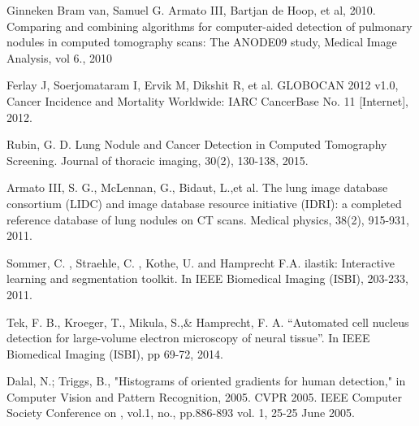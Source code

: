 \documentclass[conference]{IEEEtran}
\begin{document}
\begin{thebibliography}{1}

Ginneken Bram van, Samuel G. Armato III, Bartjan de Hoop, et al, 2010.  Comparing and combining algorithms for computer-aided detection of pulmonary nodules in computed tomography scans: The ANODE09 study, Medical Image Analysis, vol 6., 2010

Ferlay J, Soerjomataram I, Ervik M, Dikshit R, et al. GLOBOCAN 2012 v1.0, Cancer Incidence and Mortality Worldwide: IARC CancerBase No. 11 [Internet], 2012.

Rubin, G. D. Lung Nodule and Cancer Detection in Computed Tomography Screening. Journal of thoracic imaging, 30(2), 130-138, 2015.

Armato III, S. G., McLennan, G., Bidaut, L.,et al. The lung image database consortium (LIDC) and image database resource initiative (IDRI): a completed reference database of lung nodules on CT scans. Medical physics, 38(2), 915-931, 2011.

Sommer, C. , Straehle, C. , Kothe, U. and Hamprecht F.A. ilastik: Interactive learning and segmentation toolkit. In IEEE Biomedical Imaging (ISBI), 203-233, 2011.

Tek, F. B., Kroeger, T., Mikula, S.,\& Hamprecht, F. A. “Automated cell nucleus detection for large-volume electron microscopy of neural tissue”. In IEEE Biomedical Imaging (ISBI), pp 69-72, 2014.


Dalal, N.; Triggs, B., "Histograms of oriented gradients for human detection," in Computer Vision and Pattern Recognition, 2005. CVPR 2005. IEEE Computer Society Conference on , vol.1, no., pp.886-893 vol. 1, 25-25 June 2005.

\end{thebibliography}

\end{document}
